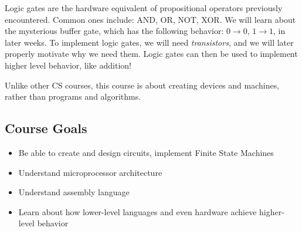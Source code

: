 Logic gates are the hardware equivalent of propositional operators previously encountered. Common ones include: AND, OR, NOT, XOR. We will learn about the mysterious buffer gate, which has the following behavior: $0 \to 0$, $1 \to 1$, in later weeks. To implement logic gates, we will need \textit{transistors}, and we will later properly motivate why we need them. Logic gates can then be used to implement higher level behavior, like addition!

Unlike other CS courses, this course is about creating devices and machines, rather than programs and algorithms.

\subsection{Course Goals}

\begin{itemize}
\item Be able to create and design circuits, implement Finite State Machines
\item Understand microprocessor architecture
\item Understand assembly language
\item Learn about how lower-level languages and even hardware achieve higher-level behavior
\end{itemize}


